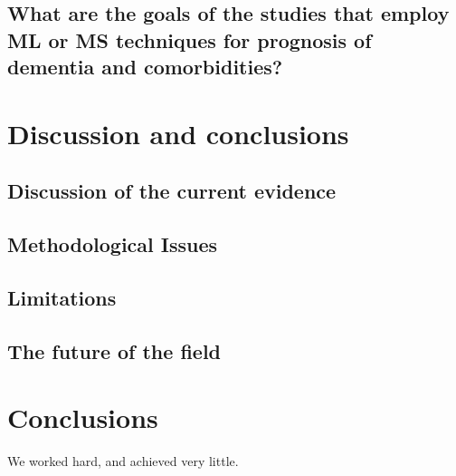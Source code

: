 \documentclass[12pt]{article}
\begin{document}
\subsection{What are the goals of the studies that employ ML or MS techniques for prognosis of dementia and comorbidities?}


\section{Discussion and conclusions}\label{discussion}
\subsection{Discussion of the current evidence}
\subsection{Methodological Issues}
\subsection{Limitations}
\subsection{The future of the field}

\section{Conclusions}\label{conclusions}
We worked hard, and achieved very little.






\appendix
\end{document}

